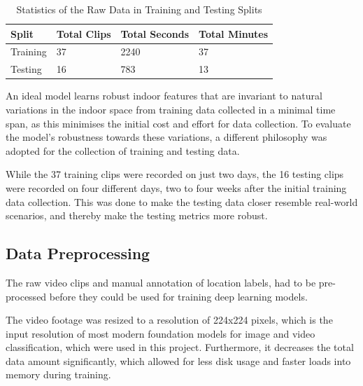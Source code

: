\documentclass{article}
\begin{document}
  \begin{table}[ht]
    \centering
    \begin{tabular}{llll}
    \toprule
    \bfseries Split & Total Clips & Total Seconds & Total Minutes \\
    \midrule
    Training & 37 &  2240 & 37 \\
    Testing & 16 & 783 & 13 \\
    \bottomrule
    \end{tabular}
    \caption{Statistics of the Raw Data in Training and Testing Splits}
    \label{tab:data-stats}
  \end{table}

  An ideal model learns robust indoor features that are invariant to natural 
  variations in the indoor space from training data collected in a minimal time
  span, as this minimises the initial cost and effort for data collection.
  To evaluate the model's robustness towards these variations, a different
  philosophy was adopted for the collection of training and testing data.

  While the 37 training clips were recorded on just two days, the 16 testing
  clips were recorded on four different days, two to four weeks after the
  initial training data collection. This was done to make the testing data
  closer resemble real-world scenarios, and thereby make the testing metrics
  more robust.
  


  \subsection{Data Preprocessing} %
  \label{sub:data-preprocessing}

  The raw video clips and manual annotation of location labels, had to be
  pre-processed before they could be used for training deep learning models.

  The video footage was resized to a resolution of 224x224 pixels, which is the
  input resolution of most modern foundation models for image and video
  classification, which were used in this project. Furthermore, it decreases the 
  total data amount significantly, which allowed for less disk usage and faster
  loads into memory during training.
\end{document}
